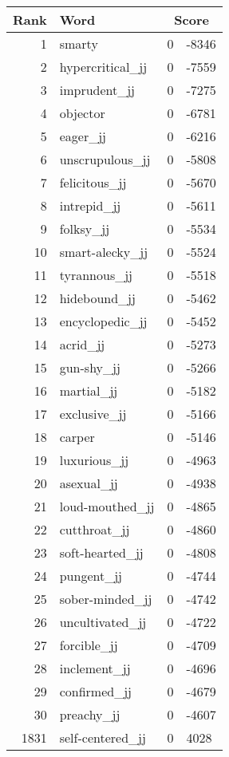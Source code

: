 \begin{longtable}[!htbp]{| rlr@{.}l |}
    \hline
    \textbf{Rank} & \textbf{Word} & \multicolumn{2}{c|}{\textbf{Score}} \\
    \hline
    \endhead
    1 & smarty & 0 & -8346 \\
    2 & hypercritical\_jj & 0 & -7559 \\
    3 & imprudent\_jj & 0 & -7275 \\
    4 & objector & 0 & -6781 \\
    5 & eager\_jj & 0 & -6216 \\
    6 & unscrupulous\_jj & 0 & -5808 \\
    7 & felicitous\_jj & 0 & -5670 \\
    8 & intrepid\_jj & 0 & -5611 \\
    9 & folksy\_jj & 0 & -5534 \\
    10 & smart-alecky\_jj & 0 & -5524 \\
    11 & tyrannous\_jj & 0 & -5518 \\
    12 & hidebound\_jj & 0 & -5462 \\
    13 & encyclopedic\_jj & 0 & -5452 \\
    14 & acrid\_jj & 0 & -5273 \\
    15 & gun-shy\_jj & 0 & -5266 \\
    16 & martial\_jj & 0 & -5182 \\
    17 & exclusive\_jj & 0 & -5166 \\
    18 & carper & 0 & -5146 \\
    19 & luxurious\_jj & 0 & -4963 \\
    20 & asexual\_jj & 0 & -4938 \\
    21 & loud-mouthed\_jj & 0 & -4865 \\
    22 & cutthroat\_jj & 0 & -4860 \\
    23 & soft-hearted\_jj & 0 & -4808 \\
    24 & pungent\_jj & 0 & -4744 \\
    25 & sober-minded\_jj & 0 & -4742 \\
    26 & uncultivated\_jj & 0 & -4722 \\
    27 & forcible\_jj & 0 & -4709 \\
    28 & inclement\_jj & 0 & -4696 \\
    29 & confirmed\_jj & 0 & -4679 \\
    30 & preachy\_jj & 0 & -4607 \\
    1831 & self-centered\_jj & 0 & 4028 \\

\end{longtable}
